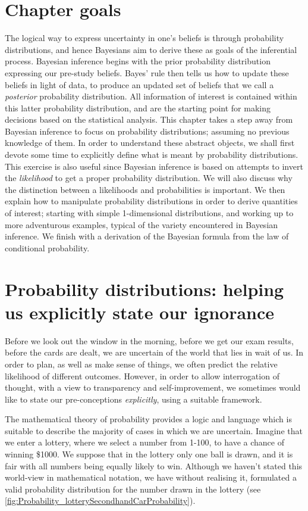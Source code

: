 \documentclass[11pt,fullpage]{book}
\begin{document}
\section{Chapter goals}
The logical way to express uncertainty in one's beliefs is through probability distributions, and hence Bayesians aim to derive these as goals of the inferential process. Bayesian inference begins with the prior probability distribution expressing our pre-study beliefs. Bayes' rule then tells us how to update these beliefs in light of data, to produce an updated set of beliefs that we call a \textit{posterior} probability distribution. All information of interest is contained within this latter probability distribution, and are the starting point for making decisions based on the statistical analysis. This chapter takes a step away from Bayesian inference to focus on probability distributions; assuming no previous knowledge of them. In order to understand these abstract objects, we shall first devote some time to explicitly define what is meant by probability distributions. This exercise is also useful since Bayesian inference is based on attempts to invert the \textit{likelihood} to get a proper probability distribution. We will also discuss why the distinction between a likelihoods and probabilities is important. We then explain how to manipulate probability distributions in order to derive quantities of interest; starting with simple 1-dimensional distributions, and working up to more adventurous examples, typical of the variety encountered in Bayesian inference. We finish with a derivation of the Bayesian formula from the law of conditional probability. 


\section{Probability distributions: helping us explicitly state our ignorance}\label{sec:Probability_probabilityDistributions}
Before we look out the window in the morning, before we get our exam results, before the cards are dealt, we are uncertain of the world that lies in wait of us. In order to plan, as well as make sense of things, we often predict the relative likelihood of different outcomes. However, in order to allow interrogation of thought, with a view to transparency and self-improvement, we sometimes would like to state our pre-conceptions \textit{explicitly}, using a suitable framework. 

The mathematical theory of probability provides a logic and language which is suitable to describe the majority of cases in which we are uncertain. Imagine that we enter a lottery, where we select a number from 1-100, to have a chance of winning \$1000. We suppose that in the lottery only one ball is drawn, and it is fair with all numbers being equally likely to win. Although we haven't stated this world-view in mathematical notation, we have without realising it, formulated a valid probability distribution for the number drawn in the lottery (see \ref{fig:Probability_lotterySecondhandCarProbability}).
\end{document}

